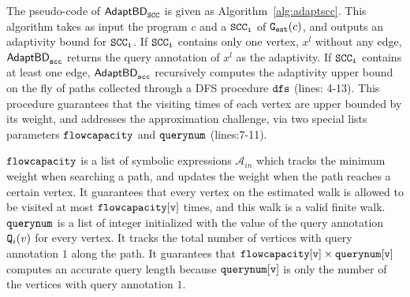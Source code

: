 The pseudo-code of $\mathsf{AdaptBD}_{\mathtt{SCC}}$ is given as Algorithm~\ref{alg:adaptscc}.
This algorithm takes as input the program $c$ and a $\mathtt{SCC_i}$ of
$\mathtt{{G_{est}}}(c)$, and outputs an adaptivity bound for $\mathtt{SCC_i}$. 
If $\mathtt{SCC_i}$ contains only one vertex, $x^l$ without any edge, $\mathtt{\mathsf{AdaptBD}_{scc}}$ returns the query annotation of $x^l$ as the adaptivity.
If $\mathtt{SCC_i}$ contains at least one edge, 
$\mathtt{\mathsf{AdaptBD}_{scc}}$
recursively computes the adaptivity upper bound on the fly of paths collected through a DFS procedure $\mathtt{dfs}$ (lines: 4-13). This procedure guarantees that the visiting times of each vertex are upper bounded by its weight, and addresses the approximation challenge,
via two special lists parameters $\mathtt{flowcapacity}$ and $\mathtt{querynum}$ (lines:7-11).
 
 
$\mathtt{flowcapacity}$ is a list of symbolic expressions $\mathcal{A}_{in}$ which tracks the minimum weight
when searching a path,
and updates the weight when the path reaches a certain vertex. It guarantees that every vertex on the estimated walk is allowed to be visited at most $\mathtt{flowcapacity[v]}$ times, and this walk is a valid finite walk.
%
$\mathtt{querynum}$ is a list of integer
initialized with the value of the query annotation $\mathtt{Q}_i(v)$ for every vertex. 
It tracks the total number of vertices with query annotation $1$
along the path. It guarantees that $\mathtt{flowcapacity[v] \times querynum[v]}$ computes an accurate query length
because $\mathtt{querynum[v]}$ is only the number of the vertices with query annotation $1$.

